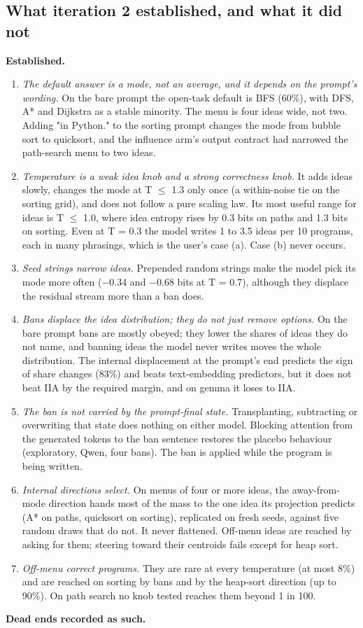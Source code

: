 \documentclass[11pt,letterpaper]{article}
\begin{document}
\subsection{What iteration 2 established, and what it did not}
\textbf{Established.}

\begin{enumerate}
\item \emph{The default answer is a mode, not an average, and it depends on the prompt's wording.} On the bare prompt the open-task default is BFS (60\%), with DFS, A* and Dijkstra as a stable minority. The menu is four ideas wide, not two. Adding "in Python." to the sorting prompt changes the mode from bubble sort to quicksort, and the influence arm's output contract had narrowed the path-search menu to two ideas.
\item \emph{Temperature is a weak idea knob and a strong correctness knob.} It adds ideas slowly, changes the mode at T \ensuremath{\leq} 1.3 only once (a within-noise tie on the sorting grid), and does not follow a pure scaling law. Its most useful range for ideas is T \ensuremath{\leq} 1.0, where idea entropy rises by 0.3 bits on paths and 1.3 bits on sorting. Even at T = 0.3 the model writes 1 to 3.5 ideas per 10 programs, each in many phrasings, which is the user's case (a). Case (b) never occurs.
\item \emph{Seed strings narrow ideas.} Prepended random strings make the model pick its mode more often (\ensuremath{-}0.34 and \ensuremath{-}0.68 bits at T = 0.7), although they displace the residual stream more than a ban does.
\item \emph{Bans displace the idea distribution; they do not just remove options.} On the bare prompt bans are mostly obeyed; they lower the shares of ideas they do not name, and banning ideas the model never writes moves the whole distribution. The internal displacement at the prompt's end predicts the sign of share changes (83\%) and beats text-embedding predictors, but it does not beat IIA by the required margin, and on gemma it loses to IIA.
\item \emph{The ban is not carried by the prompt-final state.} Transplanting, subtracting or overwriting that state does nothing on either model. Blocking attention from the generated tokens to the ban sentence restores the placebo behaviour (exploratory, Qwen, four bans). The ban is applied while the program is being written.
\item \emph{Internal directions select.} On menus of four or more ideas, the away-from-mode direction hands most of the mass to the one idea its projection predicts (A* on paths, quicksort on sorting), replicated on fresh seeds, against five random draws that do not. It never flattened. Off-menu ideas are reached by asking for them; steering toward their centroids fails except for heap sort.
\item \emph{Off-menu correct programs.} They are rare at every temperature (at most 8\%) and are reached on sorting by bans and by the heap-sort direction (up to 90\%). On path search no knob tested reaches them beyond 1 in 100.
\end{enumerate}
\textbf{Dead ends recorded as such.}
\end{document}
